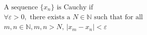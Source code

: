 \documentclass[preview]{standalone}
\begin{document}
\begin{align*}
\text{A sequence } \{x_n\} \text{ is Cauchy if } \\ \forall \varepsilon > 0, \text{ there exists a } N \in \mathbb{N} \text{ such that for all } \\ m, n \in \mathbb{N}, m, n > N, \, |x_m - x_n| < \varepsilon
\end{align*}
\end{document}
